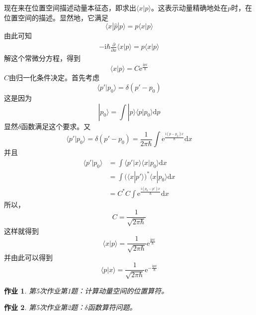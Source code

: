 \documentclass[12pt]{article}
\newtheorem{asg}{作业}
\begin{document}
    现在来在位置空间描述动量本征态，即求出$\langle x|p \rangle$。这表示动量精确地处在$p$时，在位置空间的描述。显然地，它满足
    \begin{equation}
        \langle x|\hat{p}|p\rangle = p\langle x|p \rangle
    \end{equation}
    由此可知 
    \begin{equation}\begin{aligned}
        -\mathrm{i}\hbar \frac {\partial}{\partial x} \langle x|p \rangle = p \langle x|p \rangle
    \end{aligned}\end{equation}
    解这个常微分方程，得到
    \begin{equation}
        \langle x|p \rangle = C \mathrm{e}^{\frac {\mathrm{i}px}\hbar}
    \end{equation}
    $C$由归一化条件决定。首先考虑
    \begin{equation}
        \langle p' | p_0 \rangle = \delta (p'-p_0)
    \end{equation}
    这是因为
    \begin{equation}
        |p_0 \rangle = \int |p\rangle \langle p|p_0\rangle \mathrm{d}p
    \end{equation}
    显然$\delta$函数满足这个要求。又
    \begin{equation}
        \langle p' | p_0 \rangle = \delta (p'-p_0) = \frac 1{2\pi\hbar} \int \mathrm{e}^{\frac {\mathrm{i}(p-p_0)x}{\hbar}} \mathrm{d}x
    \end{equation}
    并且
    \begin{equation}\begin{aligned}
        \langle p'|p_0 \rangle &= \int \langle p'|x\rangle \langle x|p_0 \rangle \mathrm{d}x\\
        &= \int (\langle x|p' \rangle)^* \langle x|p_0 \rangle \mathrm{d}x\\
        &= C^*C\int \mathrm{e}^{\frac {\mathrm{i}(p_0-p')x}{\hbar}} \mathrm{d}x
    \end{aligned}\end{equation}
    所以， 
    \begin{equation}
        C = \frac 1{\sqrt{2\pi\hbar}}
    \end{equation}
    这样就得到 
    \begin{equation}
        \langle x|p \rangle = \frac 1{\sqrt{2\pi\hbar}} \mathrm{e}^{\frac {\mathrm{i}px}{\hbar}}
    \end{equation}
    并由此可以得到
    \begin{equation}
        \langle p|x \rangle = \frac 1{\sqrt{2\pi\hbar}} \mathrm{e}^{-\frac {\mathrm{i}px}{\hbar}}
    \end{equation}
    \begin{asg}
        第5次作业第1题：计算动量空间的位置算符。
    \end{asg}
    \begin{asg}
        第5次作业第2题：$\delta$函数算符问题。
    \end{asg}
\end{document}
